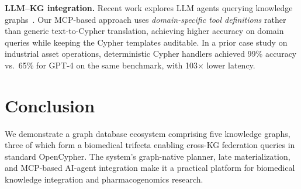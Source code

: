 \documentclass[sigconf, anonymous, review]{acmart}
\begin{document}
\smallskip\noindent\textbf{LLM--KG integration.}
Recent work explores LLM agents querying knowledge
graphs~\cite{pan2024unifying}.
Our MCP-based approach uses \emph{domain-specific tool
definitions} rather than generic text-to-Cypher translation,
achieving higher accuracy on domain queries while keeping the
Cypher templates auditable.  In a prior case study on industrial
asset operations, deterministic Cypher handlers achieved 99\%
accuracy vs.\ 65\% for GPT-4 on the same benchmark, with 103$\times$
lower latency.

\section{Conclusion}

We demonstrate a graph database ecosystem comprising five knowledge
graphs, three of which form a biomedical trifecta enabling cross-KG
federation queries in standard OpenCypher.  The system's graph-native
planner, late materialization, and MCP-based AI-agent integration
make it a practical platform for biomedical knowledge integration
and pharmacogenomics research.
\end{document}

